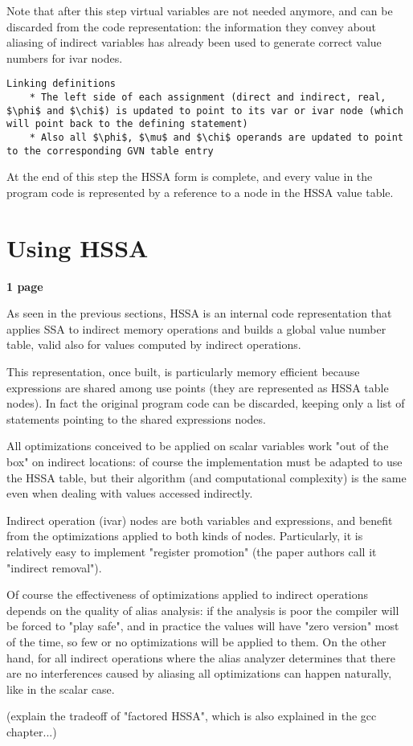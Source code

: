 Note that after this step virtual variables are not needed anymore, and can be discarded from the code representation: the information they convey about aliasing of indirect variables has already been used to generate correct value numbers for ivar nodes.

\begin{verbatim}
Linking definitions
    * The left side of each assignment (direct and indirect, real, $\phi$ and $\chi$) is updated to point to its var or ivar node (which will point back to the defining statement)
    * Also all $\phi$, $\mu$ and $\chi$ operands are updated to point to the corresponding GVN table entry
\end{verbatim}

At the end of this step the HSSA form is complete, and every value in the program code is represented by a reference to a node in the HSSA value table.

\section{Using HSSA}
\textbf{1 page}

As seen in the previous sections, HSSA is an internal code representation that applies SSA to indirect memory operations and builds a global value number table, valid also for values computed by indirect operations.


This representation, once built, is particularly memory efficient because expressions are shared among use points (they are represented as HSSA table nodes). In fact the original program code can be discarded, keeping only a list of statements pointing to the shared expressions nodes.

All optimizations conceived to be applied on scalar variables work "out of the box" on indirect locations: of course the implementation must be adapted to use the HSSA table, but their algorithm (and computational complexity) is the same even when dealing with values accessed indirectly.

Indirect operation (ivar) nodes are both variables and expressions, and benefit from the optimizations applied to both kinds of nodes. Particularly, it is relatively easy to implement "register promotion" (the paper authors call it "indirect removal").

Of course the effectiveness of optimizations applied to indirect operations depends on the quality of alias analysis: if the analysis is poor the compiler will be forced to "play safe", and in practice the values will have "zero version" most of the time, so few or no optimizations will be applied to them.
On the other hand, for all indirect operations where the alias analyzer determines that there are no interferences caused by aliasing all optimizations can happen naturally, like in the scalar case.

(explain the tradeoff of "factored HSSA", which is also explained in the gcc chapter...)



